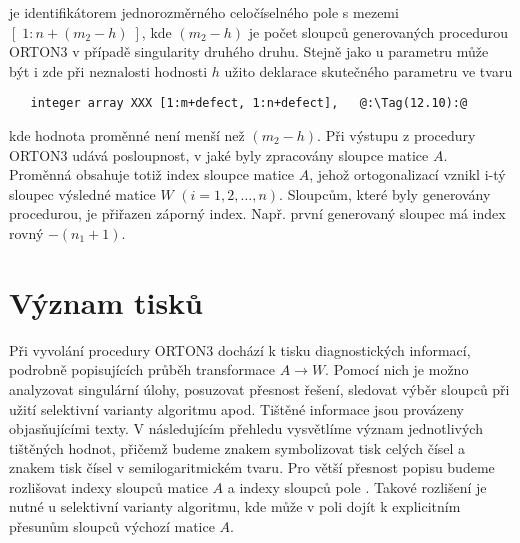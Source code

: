  je identifikátorem jednorozměrného
celočíselného pole s mezemi $[\;1:n+(m_2-h)\;]$, kde $(m_2-h)$ je počet
sloupců generovaných procedurou ORTON3 v případě singularity druhého
druhu. Stejně jako u parametru  může být i zde při neznalosti
hodnosti $h$ užito deklarace skutečného parametru ve tvaru
%
\begin{lstlisting}
   integer array XXX [1:m+defect, 1:n+defect],   @:\Tag(12.10):@
\end{lstlisting}
%
kde  hodnota proměnné  není menší než
$(m_2-h)$.  Při výstupu z procedury ORTON3 udává 
posloupnost, v jaké byly zpracovány sloupce matice
$A$. Proměnná  obsahuje totiž index sloupce matice $A$,
jehož ortogonalizací vznikl i-tý sloupec výsledné matice $W$
$(i=1,2,\ldots,n)$. Sloupcům, které byly generovány procedurou, je
přiřazen záporný index. Např. první generovaný sloupec má index rovný
$-(n_1+1)$.



\section{Význam tisků}

Při vyvolání procedury ORTON3 dochází k tisku
diagnostických informací, podrobně popisujících průběh transformace
%
$A \rightarrow W$.
%
Pomocí nich je možno analyzovat singulární úlohy, posuzovat
přesnost řešení, sledovat výběr sloupců při užití selektivní
varianty algoritmu apod. Tištěné informace jsou provázeny
objasňujícími texty. V následujícím přehledu vysvětlíme význam
jednotlivých tištěných hodnot, přičemž budeme znakem 
symbolizovat tisk celých čísel a znakem  tisk čísel v
semilogaritmickém tvaru. Pro větší přesnost popisu budeme rozlišovat
indexy sloupců matice $A$ a indexy sloupců pole . Takové
rozlišení je nutné u selektivní varianty algoritmu, kde může v poli
 dojít k explicitním přesunům sloupců výchozí matice $A$.


\newenvironment{Minipage}{%
\noindent\begin{minipage}{\linewidth}
\vspace{2.2ex}
}{\end{minipage}}

